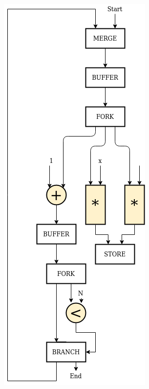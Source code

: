 \documentclass{beamer}
\begin{document}
\begin{frame}[fragile]
\begin{columns}[T]
\begin{column}{0.45\textwidth}
\begin{center}
      \includegraphics[scale=0.25]{base_case.png}
    \end{center}
    \end{column}
  \end{columns}
\end{frame}
\end{document}
